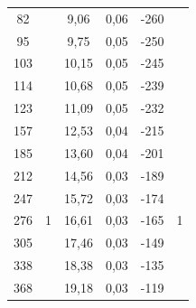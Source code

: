 \documentclass[a4paper,12pt]{report}
\begin{document}
\begin{table}[H]
\begin{tabular}{|c|c|c|c|c|c|}
82                            &                                       & 9,06                              & 0,06                              & -260                         &                                      \\ \cline{1-1} \cline{3-5}
95                            &                                       & 9,75                              & 0,05                              & -250                         &                                      \\ \cline{1-1} \cline{3-5}
103                           &                                       & 10,15                             & 0,05                              & -245                         &                                      \\ \cline{1-1} \cline{3-5}
114                           &                                       & 10,68                             & 0,05                              & -239                         &                                      \\ \cline{1-1} \cline{3-5}
123                           &                                       & 11,09                             & 0,05                              & -232                         &                                      \\ \cline{1-1} \cline{3-5}
157                           &                                       & 12,53                             & 0,04                              & -215                         &                                      \\ \hline
185 & \multirow{13}{*}{1} & 13,60 & 0,04 & -201 & \multirow{13}{*}{1} \\ \cline{1-1} \cline{3-5}
212 &                     & 14,56 & 0,03 & -189 &                     \\ \cline{1-1} \cline{3-5}
247 &                     & 15,72 & 0,03 & -174 &                     \\ \cline{1-1} \cline{3-5}
276 &                     & 16,61 & 0,03 & -165 &                     \\ \cline{1-1} \cline{3-5}
305 &                     & 17,46 & 0,03 & -149 &                     \\ \cline{1-1} \cline{3-5}
338 &                     & 18,38 & 0,03 & -135 &                     \\ \cline{1-1} \cline{3-5}
368 &                     & 19,18 & 0,03 & -119 &                     \\ \cline{1-1} \cline{3-5}

\end{tabular}
\end{table}
\end{document}
